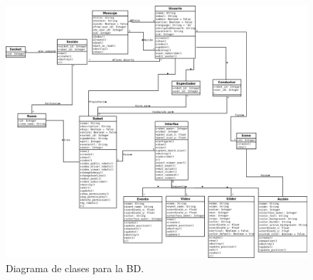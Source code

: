 \begin{figure}[H]
  \begin{center}
    \includegraphics[scale=0.35,angle=270]{diagramas/ModeloUML.png}
  \end{center}
  \caption{Diagrama de clases para la BD.}
  \label{diagram:caso-uso}
\end{figure}

